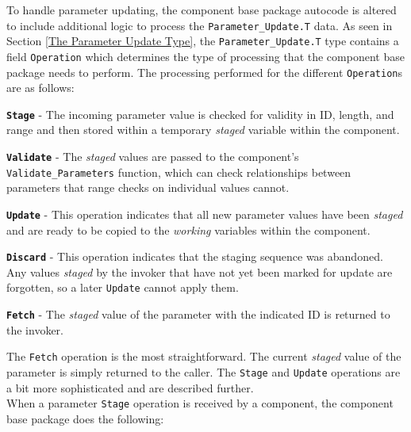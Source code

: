 To handle parameter updating, the component base package autocode is altered to include additional logic to process the \texttt{Parameter\_Update.T} data. As seen in Section \ref{The Parameter Update Type}, the \texttt{Parameter\_Update.T} type contains a field \texttt{Operation} which determines the type of processing that the component base package needs to perform. The processing performed for the different \texttt{Operation}s are as follows:

\vspace{5mm} %
\begin{spaceditemize}
  \item \textbf{\texttt{Stage}} - The incoming parameter value is checked for validity in ID, length, and range and then stored within a temporary \textit{staged} variable within the component.
  \item \textbf{\texttt{Validate}} - The \textit{staged} values are passed to the component's \texttt{Validate\_Parameters} function, which can check relationships between parameters that range checks on individual values cannot.
  \item \textbf{\texttt{Update}} - This operation indicates that all new parameter values have been \textit{staged} and are ready to be copied to the \textit{working} variables within the component.
  \item \textbf{\texttt{Discard}} - This operation indicates that the staging sequence was abandoned. Any values \textit{staged} by the invoker that have not yet been marked for update are forgotten, so a later \texttt{Update} cannot apply them.
  \item \textbf{\texttt{Fetch}} - The \textit{staged} value of the parameter with the indicated ID is returned to the invoker.
\end{spaceditemize}
\vspace{5mm} %

The \texttt{Fetch} operation is the most straightforward. The current \textit{staged} value of the parameter is simply returned to the caller. The \texttt{Stage} and \texttt{Update} operations are a bit more sophisticated and are described further. \\

When a parameter \texttt{Stage} operation is received by a component, the component base package does the following:

